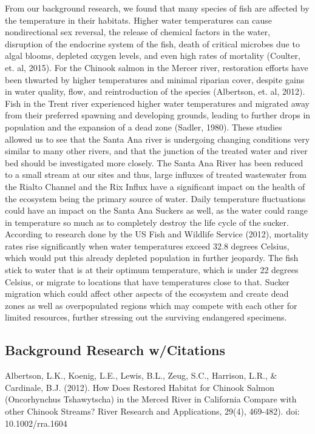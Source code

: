 \documentclass{article}\usepackage[]{graphicx}\usepackage[]{color}
\begin{document}
From our background research, we found that many species of fish are affected by the temperature in their habitats. Higher water temperatures can cause nondirectional sex reversal, the release of chemical factors in the water, disruption of the endocrine system of the fish, death of critical microbes due to algal blooms, depleted oxygen levels, and even high rates of mortality (Coulter, et. al, 2015). For the Chinook salmon in the Mercer river, restoration efforts have been thwarted by higher temperatures and minimal riparian cover, despite gains in water quality, flow, and reintroduction of the species (Albertson, et. al, 2012). Fish in the Trent river experienced higher water temperatures and migrated away from their preferred spawning and developing grounds, leading to further drops in population and the expansion of a dead zone (Sadler, 1980). These studies allowed us to see that the Santa Ana river is undergoing changing conditions very similar to many other rivers, and that the junction of the treated water and river bed should be investigated more closely. The Santa Ana River has been reduced to a small stream at our sites and thus, large influxes of treated wastewater from the Rialto Channel and the Rix Influx have a significant impact on the health of the ecosystem being the primary source of water. Daily temperature fluctuations could have an impact on the Santa Ana Suckers as well, as the water could range in temperature so much as to completely destroy the life cycle of the sucker. According to research done by the US Fish and Wildlife Service (2012), mortality rates rise significantly when water temperatures exceed 32.8 degrees Celsius, which would put this already depleted population in further jeopardy. The fish stick to water that is at their optimum temperature, which is under 22 degrees Celsius, or migrate to locations that have temperatures close to that. Sucker migration which could affect other aspects of the ecosystem and create dead zones as well as overpopulated regions which may compete with each other for limited resources, further stressing out the surviving endangered specimens. 
 
\subsection{Background Research w/Citations} 

Albertson, L.K., Koenig, L.E., Lewis, B.L., Zeug, S.C., Harrison, L.R., \& Cardinale, B.J. (2012). How Does Restored Habitat for Chinook Salmon (Oncorhynchus Tshawytscha) in the Merced River in California Compare with other Chinook Streams? River Research and Applications, 29(4), 469-482). doi: 10.1002/rra.1604
\end{document}
